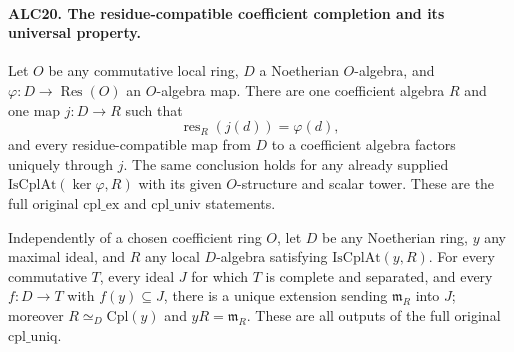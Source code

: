 \documentclass[11pt,a4paper]{article}
\numberwithin{equation}{section}
\theoremstyle{remark}\newtheorem{remark}[theorem]{Remark}
\begin{document}
\paragraph{ALC20. The residue-compatible coefficient completion and its universal property.}
\label{claim:ALC20}
Let \(O\) be any commutative local ring, \(D\) a
Noetherian \(O\)-algebra, and
\(\varphi:D\to\operatorname{Res}(O)\) an
\(O\)-algebra map.  There are one coefficient algebra
\(R\) and one map \(j:D\to R\) such that
\[
          \operatorname{res}_R(j(d))=\varphi(d),
                                                        \tag{ALC.24}
\]
and every residue-compatible map from \(D\) to a coefficient
algebra factors uniquely through \(j\).  The same conclusion
holds for any already supplied \(\mathrm{IsCplAt}(\ker\varphi,R)\)
with its given \(O\)-structure and scalar tower.  These
are the full original \(\mathrm{cpl\_\allowbreak ex}\) and
\(\mathrm{cpl\_\allowbreak univ}\) statements.

Independently of a chosen coefficient ring \(O\), let
\(D\) be any Noetherian ring, \(y\) any maximal ideal,
and \(R\) any local \(D\)-algebra satisfying
\(\mathrm{IsCplAt}(y,R)\).  For every commutative \(T\),
every ideal \(J\) for which \(T\) is complete and
separated, and every \(f:D\to T\) with \(f(y)\subseteq J\),
there is a unique extension sending \(\mathfrak m_R\)
into \(J\); moreover
\(R\simeq_D\mathrm{Cpl}(y)\) and \(yR=\mathfrak m_R\).
These are all outputs of the full original
\(\mathrm{cpl\_\allowbreak uniq}\).
\end{document}

